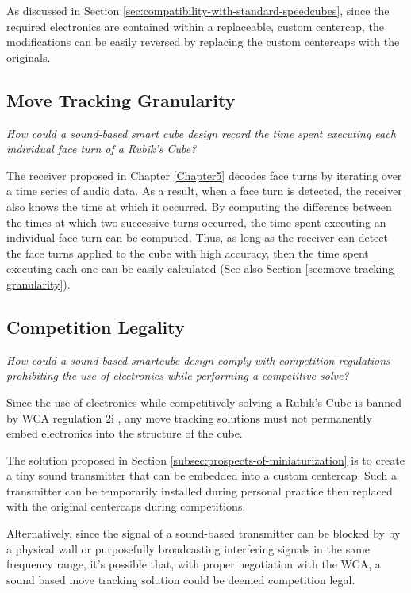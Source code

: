 As discussed in Section
\ref{sec:compatibility-with-standard-speedcubes}, since the required
electronics are contained within a replaceable, custom centercap, the
modifications can be easily reversed by replacing the custom centercaps
with the originals.


\subsection{Move Tracking Granularity}
\label{subsec:answer-granularity}

\emph{How could a sound-based smart cube design record the time spent
executing each individual face turn of a Rubik's Cube?}

The receiver proposed in Chapter \ref{Chapter5} decodes face turns by
iterating over a time series of audio data. As a result, when a face
turn is detected, the receiver also knows the time at which it
occurred. By computing the difference between the times at which two
successive turns occurred, the time spent executing an individual face
turn can be computed. Thus, as long as the receiver can detect the face
turns applied to the cube with high accuracy, then the time spent
executing each one can be easily calculated (See also Section
\ref{sec:move-tracking-granularity}).


\subsection{Competition Legality}
\label{subsec:answer-competition-legality}

\emph{How could a sound-based smartcube design comply with competition
regulations prohibiting the use of electronics while performing a
competitive solve?}

Since the use of electronics while competitively solving a Rubik's Cube
is banned by WCA regulation 2i \cite{wca-regulations}, any move
tracking solutions must not permanently embed electronics into the
structure of the cube.

The solution proposed in Section
\ref{subsec:prospects-of-miniaturization} is to create a tiny sound
transmitter that can be embedded into a custom centercap. Such a
transmitter can be temporarily installed during personal practice then
replaced with the original centercaps during competitions.

Alternatively, since the signal of a sound-based transmitter can be
blocked by by a physical wall or purposefully broadcasting interfering
signals in the same frequency range, it's possible that, with proper
negotiation with the WCA, a sound based move tracking solution could be
deemed competition legal.


